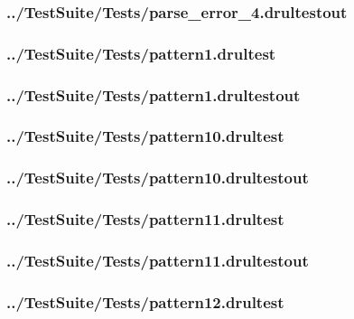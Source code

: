 \begin{changemargin}{-1in}{-1in}
\subsubsection{../TestSuite/Tests/parse\_error\_4.drultestout}


\subsubsection{../TestSuite/Tests/pattern1.drultest}


\subsubsection{../TestSuite/Tests/pattern1.drultestout}


\subsubsection{../TestSuite/Tests/pattern10.drultest}


\subsubsection{../TestSuite/Tests/pattern10.drultestout}


\subsubsection{../TestSuite/Tests/pattern11.drultest}


\subsubsection{../TestSuite/Tests/pattern11.drultestout}


\subsubsection{../TestSuite/Tests/pattern12.drultest}



\end{changemargin}

